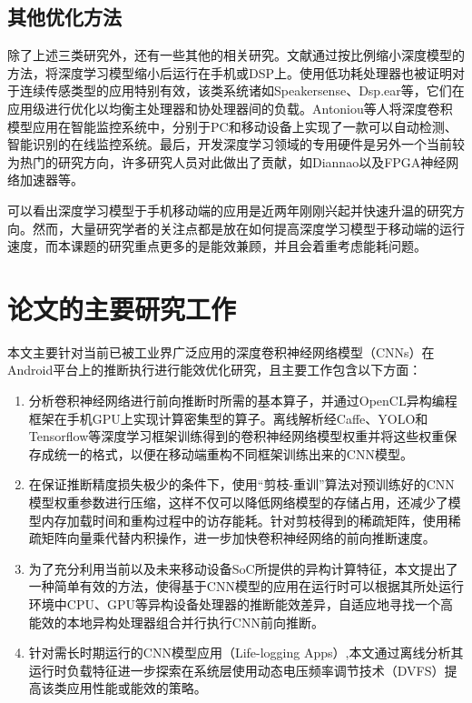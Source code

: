 \subsection{其他优化方法}
除了上述三类研究外，还有一些其他的相关研究。文献\cite{lane2015deepear,chen2014small,variani2014deep}通过按比例缩小深度模型的方法，将深度学习模型缩小后运行在手机或DSP上。使用低功耗处理器也被证明对于连续传感类型的应用特别有效，该类系统诸如Speakersense\cite{lu2011speakersense}、Dsp.ear\cite{georgiev2014dsp}等，它们在应用级进行优化以均衡主处理器和协处理器间的负载。Antoniou等人\cite{antoniou2016general}将深度卷积模型应用在智能监控系统中，分别于PC和移动设备上实现了一款可以自动检测、智能识别的在线监控系统。最后，开发深度学习领域的专用硬件是另外一个当前较为热门的研究方向，许多研究人员对此做出了贡献，如Diannao\cite{chen2014diannao}以及FPGA神经网络加速器\cite{zhang2015optimizing,wang2017dlau,yu2015deep,wang2016solar}等。

可以看出深度学习模型于手机移动端的应用是近两年刚刚兴起并快速升温的研究方向。然而，大量研究学者的关注点都是放在如何提高深度学习模型于移动端的运行速度，而本课题的研究重点更多的是能效兼顾，并且会着重考虑能耗问题。

\section{论文的主要研究工作}
本文主要针对当前已被工业界广泛应用的深度卷积神经网络模型（CNNs）在Android平台上的推断执行进行能效优化研究，且主要工作包含以下方面：
\begin{enumerate}
\item 分析卷积神经网络进行前向推断时所需的基本算子，并通过OpenCL异构编程框架在手机GPU上实现计算密集型的算子。离线解析经Caffe、YOLO\cite{redmon2016you}和Tensorflow\cite{abadi2016tensorflow}等深度学习框架训练得到的卷积神经网络模型权重并将这些权重保存成统一的格式，以便在移动端重构不同框架训练出来的CNN模型。
\item 在保证推断精度损失极少的条件下，使用“剪枝-重训”算法对预训练好的CNN模型权重参数进行压缩，这样不仅可以降低网络模型的存储占用，还减少了模型内存加载时间和重构过程中的访存能耗。针对剪枝得到的稀疏矩阵，使用稀疏矩阵向量乘代替内积操作，进一步加快卷积神经网络的前向推断速度。
\item 为了充分利用当前以及未来移动设备SoC所提供的异构计算特征，本文提出了一种简单有效的方法，使得基于CNN模型的应用在运行时可以根据其所处运行环境中CPU、GPU等异构设备处理器的推断能效差异，自适应地寻找一个高能效的本地异构处理器组合并行执行CNN前向推断。
\item 针对需长时期运行的CNN模型应用（Life-logging Apps）,本文通过离线分析其运行时负载特征进一步探索在系统层使用动态电压频率调节技术（DVFS）\cite{le2010dynamic}提高该类应用性能或能效的策略。
\end{enumerate}

